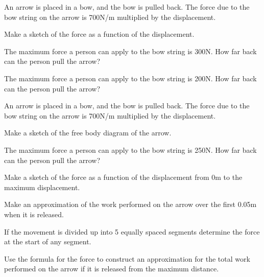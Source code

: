 \begin{problem}
\item An arrow is placed in a bow, and the bow is pulled back. The
  force due to the bow string on the arrow is 700N/m multiplied by the
  displacement. 
  \begin{subproblem}
  \item Make a sketch of the force as a function of the displacement.
    \vfill
  \item The maximum force a person can apply to the bow string is
    300N. How far back can the person pull the arrow?
    \vfill
  \item The maximum force a person can apply to the bow string is
    200N. How far back can the person pull the arrow?
    \vfill
  \end{subproblem}
\end{problem}


\begin{problem}
\item An arrow is placed in a bow, and the bow is pulled back. The
  force due to the bow string on the arrow is 700N/m multiplied by the
  displacement. 
  \begin{subproblem}
  \item Make a sketch of the free body diagram of the arrow.
    \vfill
  \item The maximum force a person can apply to the bow string is
    250N. How far back can the person pull the arrow?
    \vfill
  \item Make a sketch of the force as a function of the displacement
    from 0m to the maximum displacement.
    \vfill
    \clearpage
  \item Make an approximation of the work performed on the arrow over
    the first 0.05m when it is released.
    \vfill
  \item If the movement is divided up into 5 equally spaced segments
    determine the force at the start of any segment.
    \vfill
  \item Use the formula for the force to construct an approximation
    for the total work performed on the arrow if it is released from
    the maximum distance.
    \vfill
  \end{subproblem}
\end{problem}

